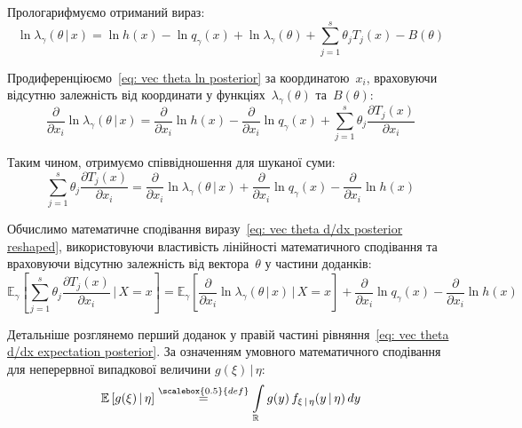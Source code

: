 Прологарифмуємо отриманий вираз:
\begin{equation}\label{eq: vec theta ln posterior}
    \ln{\lambda_{\gamma}(\theta \,|\, x)} = \ln{h(x)} - \ln{q_{\gamma}(x)} + \ln{\lambda_{\gamma}(\theta)} + \sum\limits_{j=1}^{s}\theta_j T_j(x) - B(\theta)
\end{equation}

Продиференціюємо~\eqref{eq: vec theta ln posterior} за координатою~$x_i$, враховуючи відсутню залежність від координати у функціях~$\lambda_{\gamma}(\theta)$ та~$B(\theta):$
\begin{equation}\label{eq: vec theta d/dx posterior}
    \frac{\partial}{\partial x_i}\ln{\lambda_{\gamma}(\theta \,|\, x)} = \frac{\partial}{\partial x_i}\ln{h(x)} - \frac{\partial}{\partial x_i}\ln{q_{\gamma}(x)} + \sum\limits_{j=1}^{s}\theta_j \frac{\partial T_j(x)}{\partial x_i}
\end{equation}

Таким чином, отримуємо співвідношення для шуканої суми:
\begin{equation}\label{eq: vec theta d/dx posterior reshaped}
    \sum\limits_{j=1}^{s}\theta_j \frac{\partial T_j(x)}{\partial x_i} = \frac{\partial}{\partial x_i}\ln{\lambda_{\gamma}(\theta \,|\, x)} + \frac{\partial}{\partial x_i}\ln{q_{\gamma}(x)} - \frac{\partial}{\partial x_i}\ln{h(x)}
\end{equation}

Обчислимо математичне сподівання виразу~\eqref{eq: vec theta d/dx posterior reshaped}, використовуючи властивість лінійності математичного сподівання та враховуючи відсутню залежність від вектора~$\theta$ у частини доданків: 
\begin{equation}\label{eq: vec theta d/dx expectation posterior}
    \mathbb{E}_{\gamma}\left[ \sum\limits_{j=1}^{s}\theta_j \frac{\partial T_j(x)}{\partial x_i} \,|\, X=x \right] = \mathbb{E}_{\gamma}\left[ \frac{\partial}{\partial x_i}\ln{\lambda_{\gamma}(\theta \,|\, x)} \,|\, X=x \right] + \frac{\partial}{\partial x_i}\ln{q_{\gamma}(x)} - \frac{\partial}{\partial x_i}\ln{h(x)}
\end{equation}

Детальніше розглянемо перший доданок у правій частині рівняння~\eqref{eq: vec theta d/dx expectation posterior}. За означенням умовного математичного сподівання для неперервної випадкової величини $g(\xi) \,|\, \eta:$
\begin{equation}\label{eq: def conditional expectation}
    \mathbb{E}\left[ g(\xi) \,|\, \eta \right] \overset{\scalebox{0.5}{def}}{=} \int\limits_{\mathbb{R}} g(y) \, f_{\xi \,|\, \eta}(y \,|\, \eta) \, dy
\end{equation}

